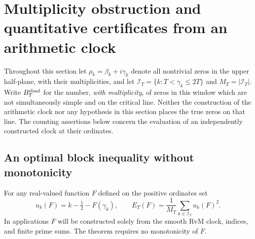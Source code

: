 \documentclass[11pt,reqno]{amsart}
\numberwithin{equation}{section}
\begin{document}
\section{Multiplicity obstruction and quantitative certificates from an arithmetic clock}
\label{sec:multiplicity-certificates}

Throughout this section let $\rho_k=\beta_k+i\gamma_k$ denote all nontrivial
zeros in the upper half-plane, with their multiplicities, and let
$\mathcal I_T=\{k:T<\gamma_k\le2T\}$ and $M_T=|\mathcal I_T|$.
Write $B_T^{\rm zbad}$ for the number, \emph{with multiplicity}, of zeros in this window
which are not simultaneously simple and on the critical line.  Neither the
construction of the arithmetic clock nor any hypothesis in this section
places the true zeros on that line.  The counting assertions below concern
the evaluation of an independently constructed clock at their ordinates.

\subsection{An optimal block inequality without monotonicity}
\label{subsec:blockcount}
For any real-valued function $F$ defined on the positive ordinates set
\begin{equation}\label{eq:blockdefect}
  u_k(F)=k-\tfrac12-F(\gamma_k),\qquad
  E_T(F)=\frac1{M_T}\sum_{k\in\mathcal I_T}u_k(F)^2.
\end{equation}
In applications $F$ will be constructed solely from the smooth RvM clock,
indices, and finite prime sums.  The theorem requires no monotonicity of $F$.
\end{document}
